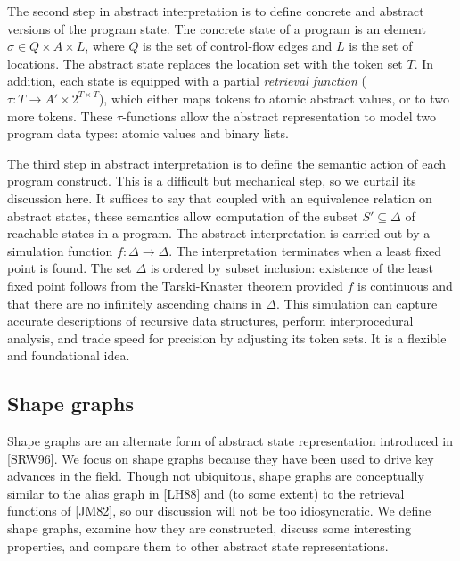 \documentclass{article}
\begin{document}
The second step in abstract interpretation is to define concrete and
abstract versions of the program state.  The concrete state of a program is
an element $\sigma \in Q \times A \times L$, where $Q$ is the set of
control-flow edges and $L$ is the set of locations. The abstract state
replaces the location set with the token set $T$. In addition, each state is
equipped with a partial \textit{retrieval function} ($\tau : T \rightarrow
A' \times 2^{T \times T}$), which either maps tokens to atomic abstract
values, or to two more tokens. These $\tau$-functions allow the abstract
representation to model two program data types: atomic values and binary
lists.

The third step in abstract interpretation is to define the semantic action
of each program construct. This is a difficult but mechanical step, so we
curtail its discussion here. It suffices to say that coupled with an
equivalence relation on abstract states, these semantics allow computation
of the subset $S' \subseteq \Delta$ of reachable states in a program.  The
abstract interpretation is carried out by a simulation function $f : \Delta
\rightarrow \Delta$. The interpretation terminates when a least fixed point
is found. The set $\Delta$ is ordered by subset inclusion: existence of the
least fixed point follows from the Tarski-Knaster theorem provided $f$ is
continuous and that there are no infinitely ascending chains in $\Delta$.
This simulation can capture accurate descriptions of recursive data
structures, perform interprocedural analysis, and trade speed for precision
by adjusting its token sets. It is a flexible and foundational idea.

\subsection{Shape graphs}

Shape graphs are an alternate form of abstract state representation
introduced in [SRW96]. We focus on shape graphs because they have been used
to drive key advances in the field. Though not ubiquitous, shape graphs are
conceptually similar to the alias graph in [LH88] and (to some extent) to
the retrieval functions of [JM82], so our discussion will not be too
idiosyncratic. We define shape graphs, examine how they are constructed,
discuss some interesting properties, and compare them to other abstract
state representations.
\end{document}
